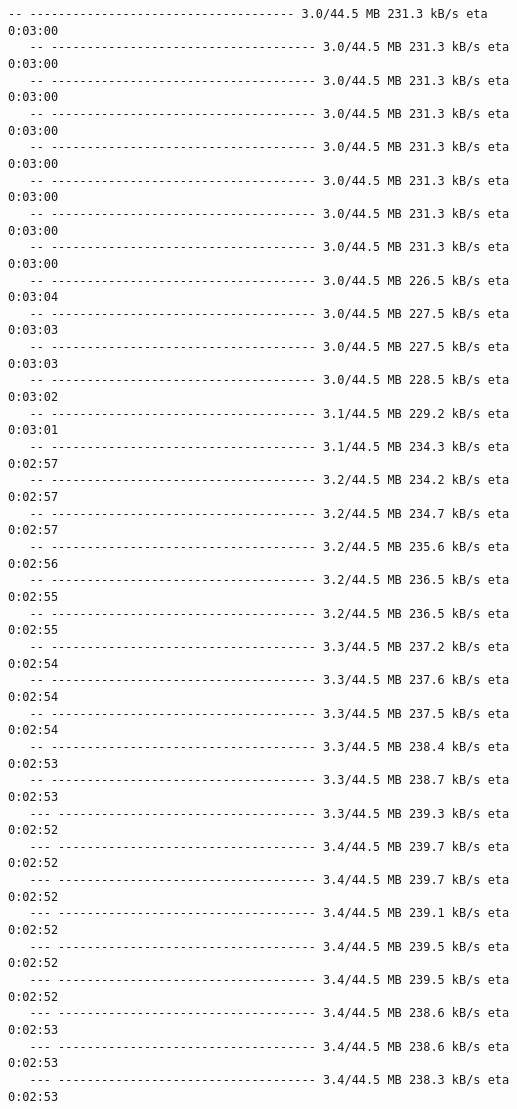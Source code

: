 \documentclass[11pt]{article}
\begin{document}
\begin{Verbatim}[commandchars=\\\{\}]
   -- ------------------------------------- 3.0/44.5 MB 231.3 kB/s eta 0:03:00
   -- ------------------------------------- 3.0/44.5 MB 231.3 kB/s eta 0:03:00
   -- ------------------------------------- 3.0/44.5 MB 231.3 kB/s eta 0:03:00
   -- ------------------------------------- 3.0/44.5 MB 231.3 kB/s eta 0:03:00
   -- ------------------------------------- 3.0/44.5 MB 231.3 kB/s eta 0:03:00
   -- ------------------------------------- 3.0/44.5 MB 231.3 kB/s eta 0:03:00
   -- ------------------------------------- 3.0/44.5 MB 231.3 kB/s eta 0:03:00
   -- ------------------------------------- 3.0/44.5 MB 231.3 kB/s eta 0:03:00
   -- ------------------------------------- 3.0/44.5 MB 226.5 kB/s eta 0:03:04
   -- ------------------------------------- 3.0/44.5 MB 227.5 kB/s eta 0:03:03
   -- ------------------------------------- 3.0/44.5 MB 227.5 kB/s eta 0:03:03
   -- ------------------------------------- 3.0/44.5 MB 228.5 kB/s eta 0:03:02
   -- ------------------------------------- 3.1/44.5 MB 229.2 kB/s eta 0:03:01
   -- ------------------------------------- 3.1/44.5 MB 234.3 kB/s eta 0:02:57
   -- ------------------------------------- 3.2/44.5 MB 234.2 kB/s eta 0:02:57
   -- ------------------------------------- 3.2/44.5 MB 234.7 kB/s eta 0:02:57
   -- ------------------------------------- 3.2/44.5 MB 235.6 kB/s eta 0:02:56
   -- ------------------------------------- 3.2/44.5 MB 236.5 kB/s eta 0:02:55
   -- ------------------------------------- 3.2/44.5 MB 236.5 kB/s eta 0:02:55
   -- ------------------------------------- 3.3/44.5 MB 237.2 kB/s eta 0:02:54
   -- ------------------------------------- 3.3/44.5 MB 237.6 kB/s eta 0:02:54
   -- ------------------------------------- 3.3/44.5 MB 237.5 kB/s eta 0:02:54
   -- ------------------------------------- 3.3/44.5 MB 238.4 kB/s eta 0:02:53
   -- ------------------------------------- 3.3/44.5 MB 238.7 kB/s eta 0:02:53
   --- ------------------------------------ 3.3/44.5 MB 239.3 kB/s eta 0:02:52
   --- ------------------------------------ 3.4/44.5 MB 239.7 kB/s eta 0:02:52
   --- ------------------------------------ 3.4/44.5 MB 239.7 kB/s eta 0:02:52
   --- ------------------------------------ 3.4/44.5 MB 239.1 kB/s eta 0:02:52
   --- ------------------------------------ 3.4/44.5 MB 239.5 kB/s eta 0:02:52
   --- ------------------------------------ 3.4/44.5 MB 239.5 kB/s eta 0:02:52
   --- ------------------------------------ 3.4/44.5 MB 238.6 kB/s eta 0:02:53
   --- ------------------------------------ 3.4/44.5 MB 238.6 kB/s eta 0:02:53
   --- ------------------------------------ 3.4/44.5 MB 238.3 kB/s eta 0:02:53

\end{Verbatim}
\end{document}
